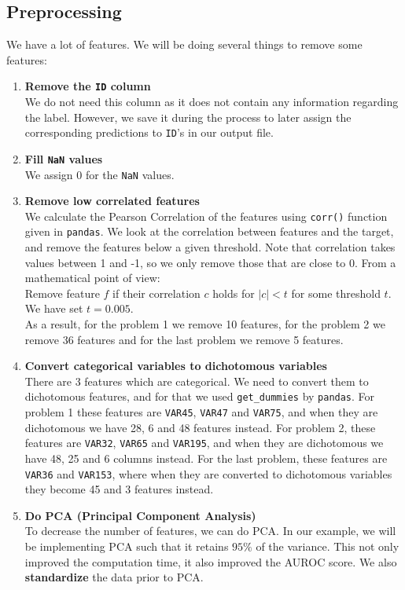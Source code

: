 \documentclass[11pt,reqno]{amsart}
\newcommand{\code}[1]{\texttt{#1}}
\begin{document}
\subsection{Preprocessing}
We have a lot of features. We will be doing several things to remove some features:
\begin{enumerate}
	\item \textbf{Remove the \code{ID} column} \\
	We do not need this column as it does not contain any information regarding the label. However, we save it during the process to later assign the corresponding predictions to \code{ID}'s in our output file.
	\item \textbf{Fill \code{NaN} values} \\
	We assign 0 for the \code{NaN} values. 
	\item \textbf{Remove low correlated features} \\
	We calculate the Pearson Correlation of the features using \code{corr()} function given in \code{pandas}. We look at the correlation between features and the target, and remove the features below a given threshold. Note that correlation takes values between 1 and -1, so we only remove those that are close to 0. From a mathematical point of view: \\
	Remove feature $f$ if their correlation $c$ holds for $|c|<t$ for some threshold $t$. We have set $t=0.005$. \\
	As a result, for the problem 1 we remove 10 features, for the problem 2 we remove 36 features and for the last problem we remove 5 features.
	\item \textbf{Convert categorical variables to dichotomous variables} \\
	There are 3 features which are categorical. We need to convert them to dichotomous features, and for that we used \code{get\_dummies} by \code{pandas}. For problem 1 these features are \code{VAR45}, \code{VAR47} and \code{VAR75}, and when they are dichotomous we have 28, 6 and 48 features instead. For problem 2, these features are \code{VAR32}, \code{VAR65} and \code{VAR195}, and when they are dichotomous we have 48, 25 and 6 columns instead. For the last problem, these features are \code{VAR36} and \code{VAR153}, where when they are converted to dichotomous variables they become 45 and 3 features instead.
	\item \textbf{Do PCA (Principal Component Analysis)} \\
	To decrease the number of features, we can do PCA. In our example, we will be implementing PCA such that it retains $95\%$ of the variance. This not only improved the computation time, it also improved the AUROC score. We also \textbf{standardize} the data prior to PCA.
\end{enumerate}
\end{document}
